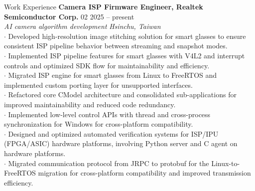 \documentclass{resume}
\begin{document}
\vspace{-1em}
\begin{rSection}{Work Experience}
    {\bf Camera ISP Firmware Engineer, Realtek Semiconductor Corp.} \hfill {02 2025 -- present}\\
    {\textit{AI camera algorithm development}} \hfill \textit{Hsinchu, Taiwan}\\
    $\cdot$ Developed high-resolution image stitching solution for smart glasses to ensure consistent ISP pipeline behavior between streaming and snapshot modes.\\
    $\cdot$ Implemented ISP pipeline features for smart glasses with V4L2 and interrupt controls and optimized SDK flow for maintainability and efficiency.\\
    $\cdot$ Migrated ISP engine for smart glasses from Linux to FreeRTOS and implemented custom porting layer for unsupported interfaces.\\
    $\cdot$ Refactored core CModel architecture and consolidated sub-applications for improved maintainability and reduced code redundancy.\\
    $\cdot$ Implemented low-level control APIs with thread and cross-process synchronization for Windows for cross-platform compatibility.\\
    $\cdot$ Designed and optimized automated verification systems for ISP/IPU (FPGA/ASIC) hardware platforms, involving Python server and C agent on hardware platforms.\\
    $\cdot$ Migrated communication protocol from JRPC to protobuf for the Linux-to-FreeRTOS migration for cross-platform compatibility and improved transmission efficiency.
\end{rSection}
\end{document}
